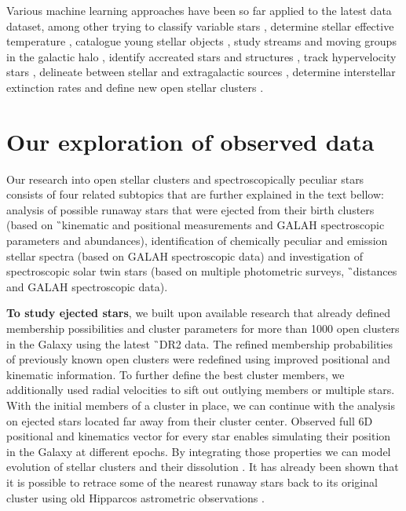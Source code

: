 Various machine learning approaches have been so far applied to the latest data dataset, among other trying to classify variable stars \cite{2020MNRAS.493.2981B}, determine stellar effective temperature \cite{2019AJ....158...93B}, catalogue young stellar objects \cite{2019MNRAS.487.2522M}, study streams and moving groups in the galactic halo \cite{2017A&A...598A..58H, 2020MNRAS.492.1370B}, identify accreated stars and structures \cite{2019arXiv190706652O, 2019arXiv190707681N}, track hypervelocity stars \cite{2017MNRAS.470.1388M}, delineate between stellar and extragalactic sources \cite{2018RAA....18..118B, 2019MNRAS.490.5615B}, determine interstellar extinction rates \cite{2020AJ....159...84B} and define new open stellar clusters \cite{2020A&A...635A..45C}.

\section{Our exploration of observed data}
Our research into open stellar clusters and spectroscopically peculiar stars consists of four related subtopics that are further explained in the text bellow: analysis of possible runaway stars that were ejected from their birth clusters (based on \G\ kinematic and positional measurements and GALAH spectroscopic parameters and abundances), identification of chemically peculiar and emission stellar spectra (based on GALAH spectroscopic data) and investigation of spectroscopic solar twin stars (based on multiple photometric surveys, \G\ distances and GALAH spectroscopic data).

\textbf{To study ejected stars}, we built upon available research that already defined membership possibilities and cluster parameters for more than 1000 open clusters in the Galaxy \cite{2018A&A...618A..93C} using the latest \G\ DR2 data. The refined membership probabilities of previously known open clusters \cite{2013A&A...558A..53K} were redefined using improved positional and kinematic information. To further define the best cluster members, we additionally used radial velocities to sift out outlying members or multiple stars. With the initial members of a cluster in place, we can continue with the analysis on ejected stars located far away from their cluster center. Observed full 6D positional and kinematics vector for every star enables simulating their position in the Galaxy at different epochs. By integrating those properties we can model evolution of stellar clusters and their dissolution \cite{1998A&A...337..363P}. It has already been shown that it is possible to retrace some of the nearest runaway stars back to its original cluster using old Hipparcos astrometric observations \cite{2000ApJ...544L.133H}.

